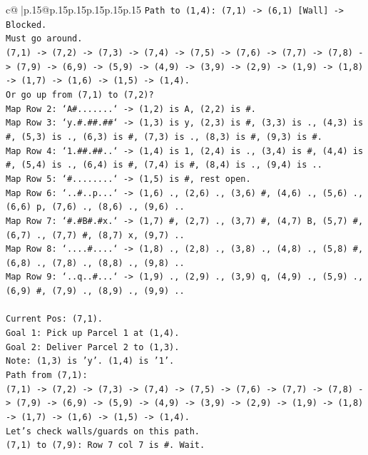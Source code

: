 \documentclass{article}
\begin{document}
{\begin{supertabular}{c@{$\;$}|p{.15\linewidth}@{}p{.15\linewidth}p{.15\linewidth}p{.15\linewidth}p{.15\linewidth}p{.15\linewidth}}
{{{\texttt{Path to (1,4): (7,1) {-}> (6,1) {[}Wall{]} {-}> Blocked.} \\
\texttt{Must go around.} \\
\texttt{(7,1) {-}> (7,2) {-}> (7,3) {-}> (7,4) {-}> (7,5) {-}> (7,6) {-}> (7,7) {-}> (7,8) {-}> (7,9) {-}> (6,9) {-}> (5,9) {-}> (4,9) {-}> (3,9) {-}> (2,9) {-}> (1,9) {-}> (1,8) {-}> (1,7) {-}> (1,6) {-}> (1,5) {-}> (1,4).} \\
\texttt{Or go up from (7,1) to (7,2)?} \\
\texttt{Map Row 2: `A\#.......` {-}> (1,2) is A, (2,2) is \#.} \\
\texttt{Map Row 3: `y.\#.\#\#.\#\#` {-}> (1,3) is y, (2,3) is \#, (3,3) is ., (4,3) is \#, (5,3) is ., (6,3) is \#, (7,3) is ., (8,3) is \#, (9,3) is \#.} \\
\texttt{Map Row 4: `1.\#\#.\#\#..` {-}> (1,4) is 1, (2,4) is ., (3,4) is \#, (4,4) is \#, (5,4) is ., (6,4) is \#, (7,4) is \#, (8,4) is ., (9,4) is ..} \\
\texttt{Map Row 5: `\#........` {-}> (1,5) is \#, rest open.} \\
\texttt{Map Row 6: `..\#..p...` {-}> (1,6) ., (2,6) ., (3,6) \#, (4,6) ., (5,6) ., (6,6) p, (7,6) ., (8,6) ., (9,6) ..} \\
\texttt{Map Row 7: `\#.\#B\#.\#x.` {-}> (1,7) \#, (2,7) ., (3,7) \#, (4,7) B, (5,7) \#, (6,7) ., (7,7) \#, (8,7) x, (9,7) ..} \\
\texttt{Map Row 8: `....\#....` {-}> (1,8) ., (2,8) ., (3,8) ., (4,8) ., (5,8) \#, (6,8) ., (7,8) ., (8,8) ., (9,8) ..} \\
\texttt{Map Row 9: `..q..\#...` {-}> (1,9) ., (2,9) ., (3,9) q, (4,9) ., (5,9) ., (6,9) \#, (7,9) ., (8,9) ., (9,9) ..} \\
\\ 
\texttt{Current Pos: (7,1).} \\
\texttt{Goal 1: Pick up Parcel 1 at (1,4).} \\
\texttt{Goal 2: Deliver Parcel 2 to (1,3).} \\
\texttt{Note: (1,3) is 'y'. (1,4) is '1'.} \\
\texttt{Path from (7,1):} \\
\texttt{(7,1) {-}> (7,2) {-}> (7,3) {-}> (7,4) {-}> (7,5) {-}> (7,6) {-}> (7,7) {-}> (7,8) {-}> (7,9) {-}> (6,9) {-}> (5,9) {-}> (4,9) {-}> (3,9) {-}> (2,9) {-}> (1,9) {-}> (1,8) {-}> (1,7) {-}> (1,6) {-}> (1,5) {-}> (1,4).} \\
\texttt{Let's check walls/guards on this path.} \\
\texttt{(7,1) to (7,9): Row 7 col 7 is \#. Wait.} \\
}}}
\end{supertabular}}
\end{document}

